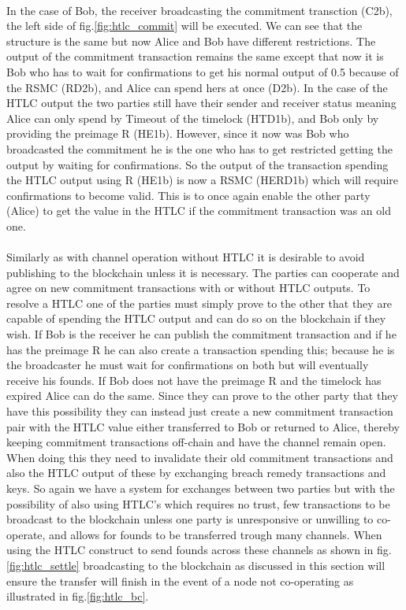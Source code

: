 \documentclass[informationsecurity]{gucmasterproject}
\begin{document}
\paragraph{}
In the case of Bob, the receiver broadcasting the commitment transction (C2b), the left side of fig.\ref{fig:htlc_commit} will be executed. We can see that the structure is the same but now Alice and Bob have different restrictions. The output of the commitment transaction remains the same except that now it is Bob who has to wait for confirmations to get his normal output of 0.5 because of the RSMC (RD2b), and Alice can spend hers at once (D2b). In the case of the HTLC output the two parties still have their sender and receiver status meaning Alice can only spend by Timeout of the timelock (HTD1b), and Bob only by providing the preimage R (HE1b). However, since it now was Bob who broadcasted the commitment he is the one who has to get restricted getting the output by waiting for confirmations. So the output of the transaction spending the HTLC output using R (HE1b) is now a RSMC (HERD1b) which will require confirmations to become valid. This is to once again enable the other party (Alice) to get the value in the HTLC if the commitment transaction was an old one.  

\paragraph{}
Similarly as with channel operation without HTLC it is desirable to avoid publishing to the blockchain unless it is necessary. The parties can cooperate and agree on new commitment transactions with or without HTLC outputs. To resolve a HTLC one of the parties must simply prove to the other that they are capable of spending the HTLC output and can do so on the blockchain if they wish. If Bob is the receiver he can publish the commitment transaction and if he has the preimage R he can also create a transaction spending this; because he is the broadcaster he must wait for confirmations on both but will eventually receive his founds. If Bob does not have the preimage R and the timelock has expired Alice can do the same. Since they can prove to the other party that they have this possibility they can instead just create a new commitment transaction pair with the HTLC value either transferred to Bob or returned to Alice, thereby keeping  commitment transactions off-chain and have the channel remain open. When doing this they need to invalidate their old commitment transactions and also the HTLC output of these by exchanging breach remedy transactions and keys. So again we have a system for exchanges between two parties but with the possibility of also using HTLC's which requires no trust, few transactions to be broadcast to the blockchain unless one party is unresponsive or unwilling to co-operate, and allows for founds to be transferred trough many channels.  
When using the HTLC construct to send founds across these channels as shown in fig.\ref{fig:htlc_settle} broadcasting to the blockchain as discussed in this section will ensure the transfer will finish in the event of a node not co-operating as illustrated in fig.\ref{fig:htlc_bc}.
\end{document}
